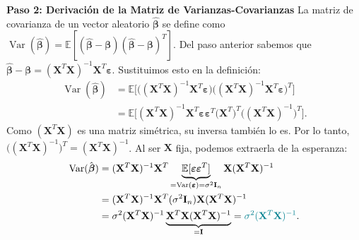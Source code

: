 \documentclass[11pt,a4paper]{article}
\newcommand{\termTeal}[1]{\textcolor{brandteal}{#1}}
\begin{document}
\begin{demobox}
\textbf{Paso 2: Derivación de la Matriz de Varianzas-Covarianzas}  
La matriz de covarianza de un vector aleatorio $\hat{\boldsymbol{\beta}}$ se define como $\operatorname{Var}(\hat{\boldsymbol{\beta}}) = \mathbb{E}[(\hat{\boldsymbol{\beta}} - \boldsymbol{\beta})(\hat{\boldsymbol{\beta}} - \boldsymbol{\beta})^T]$. Del paso anterior sabemos que $\hat{\boldsymbol{\beta}} - \boldsymbol{\beta} = (\mathbf{X}^T \mathbf{X})^{-1} \mathbf{X}^T \boldsymbol{\varepsilon}$.
Sustituimos esto en la definición:
\begin{align}
\operatorname{Var}(\hat{\boldsymbol{\beta}}) &= \mathbb{E} \Big[ \big( (\mathbf{X}^T \mathbf{X})^{-1} \mathbf{X}^T \boldsymbol{\varepsilon} \big) \big( (\mathbf{X}^T \mathbf{X})^{-1} \mathbf{X}^T \boldsymbol{\varepsilon} \big)^T \Big] \\
&= \mathbb{E} \Big[ (\mathbf{X}^T \mathbf{X})^{-1} \mathbf{X}^T \boldsymbol{\varepsilon} \boldsymbol{\varepsilon}^T \big(\mathbf{X}^T\big)^T \big((\mathbf{X}^T \mathbf{X})^{-1}\big)^T \Big].
\end{align}
Como $(\mathbf{X}^T \mathbf{X})$ es una matriz simétrica, su inversa también lo es. Por lo tanto, $\big((\mathbf{X}^T \mathbf{X})^{-1}\big)^T = (\mathbf{X}^T \mathbf{X})^{-1}$. Al ser $\mathbf{X}$ fija, podemos extraerla de la esperanza:
\begin{align}
\operatorname{Var}(\hat{\boldsymbol{\beta}}) &= (\mathbf{X}^T \mathbf{X})^{-1} \mathbf{X}^T \underbrace{\mathbb{E}[\boldsymbol{\varepsilon} \boldsymbol{\varepsilon}^T]}_{= \operatorname{Var}(\boldsymbol{\varepsilon}) = \sigma^2 \mathbf{I}_n} \mathbf{X} (\mathbf{X}^T \mathbf{X})^{-1} \\
&= (\mathbf{X}^T \mathbf{X})^{-1} \mathbf{X}^T (\sigma^2 \mathbf{I}_n) \mathbf{X} (\mathbf{X}^T \mathbf{X})^{-1} \\
&= \sigma^2 (\mathbf{X}^T \mathbf{X})^{-1} \underbrace{\mathbf{X}^T \mathbf{X} (\mathbf{X}^T \mathbf{X})^{-1}}_{= \mathbf{I}} = \termTeal{\sigma^2 (\mathbf{X}^T \mathbf{X})^{-1}}.
\end{align}
\end{demobox}
\end{document}

